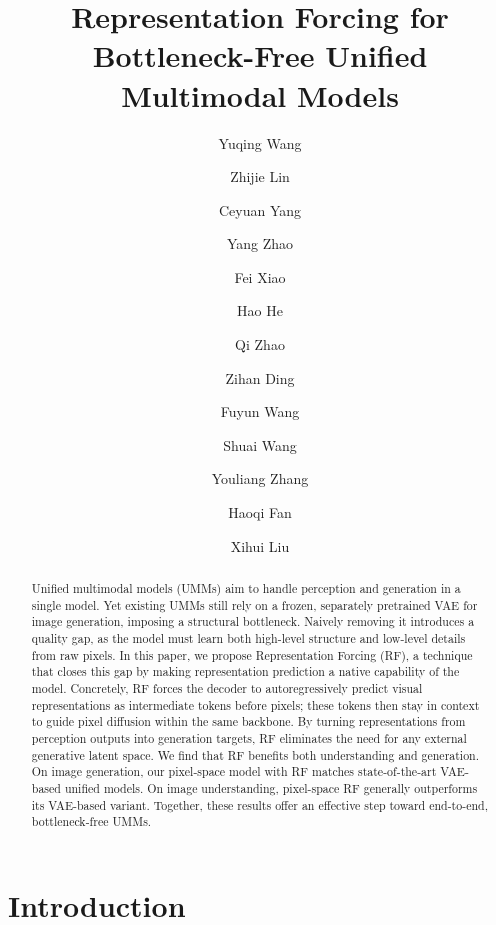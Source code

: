 \documentclass{llmxive}
\title{Representation Forcing for Bottleneck-Free Unified Multimodal Models}
\author{Yuqing Wang \and Zhijie Lin \and Ceyuan Yang \and Yang Zhao \and Fei Xiao \and Hao He \and Qi Zhao \and Zihan Ding \and Fuyun Wang \and Shuai Wang \and Youliang Zhang \and Haoqi Fan \and Xihui Liu}
\providecommand{\corrmark}{\text{\Letter}}
\providecommand{\thefootnote}{$\dagger$}
\begin{document}
\maketitle
\begin{abstract}
Unified multimodal models (UMMs) aim to handle perception and generation in a single model. Yet existing UMMs still rely on a frozen, separately pretrained VAE for image generation, imposing a structural bottleneck. Naively removing it introduces a quality gap, as the model must learn both high-level structure and low-level details from raw pixels. In this paper, we propose Representation Forcing (RF), a technique that closes this gap by making representation prediction a native capability of the model. Concretely, RF forces the decoder to autoregressively predict visual representations as intermediate tokens before pixels; these tokens then stay in context to guide pixel diffusion within the same backbone. By turning representations from perception outputs into generation targets, RF eliminates the need for any external generative latent space. We find that RF benefits both understanding and generation. On image generation, our pixel-space model with RF matches state-of-the-art VAE-based unified models. On image understanding, pixel-space RF generally outperforms its VAE-based variant. Together, these results offer an effective step toward end-to-end, bottleneck-free UMMs.
\end{abstract}
{\renewcommand{\thefootnote}{$\dagger$}%
 }
{\renewcommand{\thefootnote}{$\ddagger$}%
 }
{\renewcommand{\thefootnote}{\corrmark}%
 }
\setcounter{footnote}{0}

%
%

\section{Introduction}
\label{sec:intro}
\end{document}
